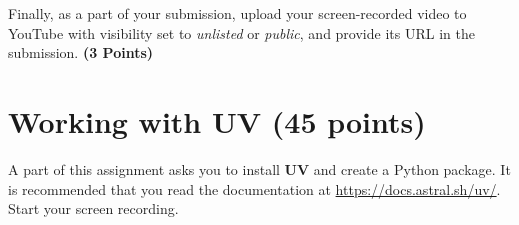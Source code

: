 \documentclass[12pt, xcolor=dvipsnames,svgnames,x11names]{article}
\begin{document}

Finally, as a part of your submission,  upload your screen-recorded video to YouTube with visibility set to \textit{unlisted} or \textit{public}, and provide its URL in the submission. \hfill \textbf{(3 Points)}




\section{Working with UV (45 points)}
A part of this assignment asks you to install \textbf{UV} and create a Python package. It is recommended that you read the documentation at \url{https://docs.astral.sh/uv/}. Start your screen recording.
\end{document}

